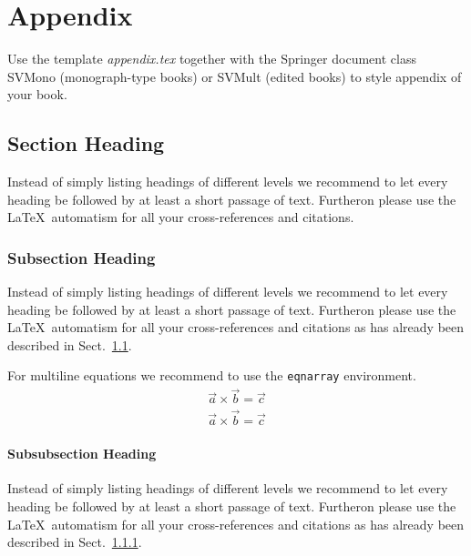 %
%
%

\appendix
{}
\chapter{Appendix}
\label{introA} %

Use the template \emph{appendix.tex} together with the Springer document class SVMono (monograph-type books) or SVMult (edited books) to style appendix of your book.


\section{Section Heading}
\label{sec:A1}
Instead of simply listing headings of different levels we recommend to let every heading be followed by at least a short passage of text. Furtheron please use the \LaTeX\ automatism for all your cross-references and citations.


\subsection{Subsection Heading}
\label{sec:A2}
Instead of simply listing headings of different levels we recommend to let every heading be followed by at least a short passage of text. Furtheron please use the \LaTeX\ automatism for all your cross-references and citations as has already been described in Sect.~\ref{sec:A1}.

For multiline equations we recommend to use the \verb|eqnarray| environment.
\begin{eqnarray}
\vec{a}\times\vec{b}=\vec{c} \nonumber\\
\vec{a}\times\vec{b}=\vec{c}
\label{eq:A01}
\end{eqnarray}

\subsubsection{Subsubsection Heading}
Instead of simply listing headings of different levels we recommend to let every heading be followed by at least a short passage of text. Furtheron please use the \LaTeX\ automatism for all your cross-references and citations as has already been described in Sect.~\ref{sec:A2}.

